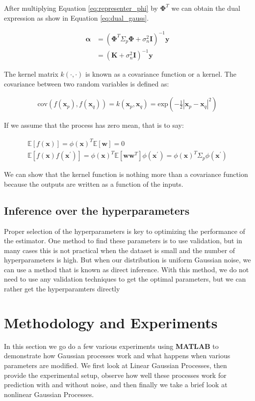 \documentclass[11pt, twoside]{article}   	%
\begin{document}
After multiplying Equation \ref{eq:representer_phi} by $\mathbf{\Phi}^T$ we can obtain the dual 
expression as show in Equation \ref{eq:dual_gauss}.

\begin{align}
\mathbf{\alpha} &= (\mathbf{\Phi}^T \Sigma_p \mathbf{\Phi} + \sigma^2_n \mathbf{I})^{-1} \mathbf{y}\\
&= (\mathbf{K} + \sigma^2_n \mathbf{I})^{-1} \mathbf{y} \label{eq:dual_gauss}
\end{align}

The kernel matrix $k(\cdot, \cdot)$ is known as a covariance function or a kernel. 
The covariance between two random variables is defined as: 

\begin{align}
\text{cov}(f(\mathbf{x}_p), f(\mathbf{x}_q)) = k(\mathbf{x}_p, \mathbf{x}_q) = \text{exp}(-\frac{1}{2}|\mathbf{x}_p - 
\mathbf{x}_q|^2)
\end{align}

If we assume that the process has zero mean, that is to say:

\begin{align}
\mathds{E}[f(\mathbf{x})] = \phi(\mathbf{x})^T \mathds{E}[\mathbf{w}] = 0 \\
\mathds{E}[f(\mathbf{x}) f(\mathbf{x}^{'})] = \phi(\mathbf{x})^T\mathds{E}[\mathbf{ww}^T]\phi(\mathbf{x}^{'}) 
= \phi(\mathbf{x})^T\Sigma_p\phi(\mathbf{x}^{'})
\end{align}

We can show that the kernel function is nothing more than a covariance function because the outputs
are written as a function of the inputs. 


\subsection{Inference over the hyperparameters}
Proper selection of the hyperparameters is key to optimizing the performance of the estimator. One
method to find these parameters is to use validation, but in many cases this is not practical when
the dataset is small and the number of hyperparameters is high. But when 
our distribution is uniform Gaussian noise, we can use a method that is
known as direct inference. With this method, we do not need to use any 
validation techniques to get the optimal parameters, but we can rather get
the hyperparamters directly 


\section{Methodology and Experiments}
In this section we go do a few various experiments using \textbf{MATLAB} to demonstrate how
Gaussian processes work and what happens when various parameters are modified. We first look
at Linear Gaussian Processes, then provide the experimental setup, observe how well these
processes work for prediction with and without noise, and then finally we take a brief look
at nonlinear Gaussian Processes. 
\end{document}
